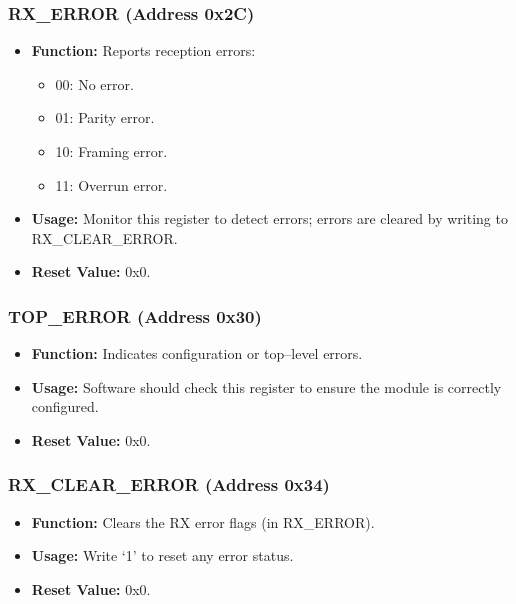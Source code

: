 \subsubsection{RX\_ERROR (Address 0x2C)}
\begin{itemize}[noitemsep]
    \item \textbf{Function:} Reports reception errors:
    \begin{itemize}
        \item 00: No error.
        \item 01: Parity error.
        \item 10: Framing error.
        \item 11: Overrun error.
    \end{itemize}
    \item \textbf{Usage:} Monitor this register to detect errors; errors are cleared by writing to RX\_CLEAR\_ERROR.
    \item \textbf{Reset Value:} 0x0.
\end{itemize}

\subsubsection{TOP\_ERROR (Address 0x30)}
\begin{itemize}[noitemsep]
    \item \textbf{Function:} Indicates configuration or top–level errors.
    \item \textbf{Usage:} Software should check this register to ensure the module is correctly configured.
    \item \textbf{Reset Value:} 0x0.
\end{itemize}

\subsubsection{RX\_CLEAR\_ERROR (Address 0x34)}
\begin{itemize}[noitemsep]
    \item \textbf{Function:} Clears the RX error flags (in RX\_ERROR).
    \item \textbf{Usage:} Write ‘1’ to reset any error status.
    \item \textbf{Reset Value:} 0x0.
\end{itemize}

